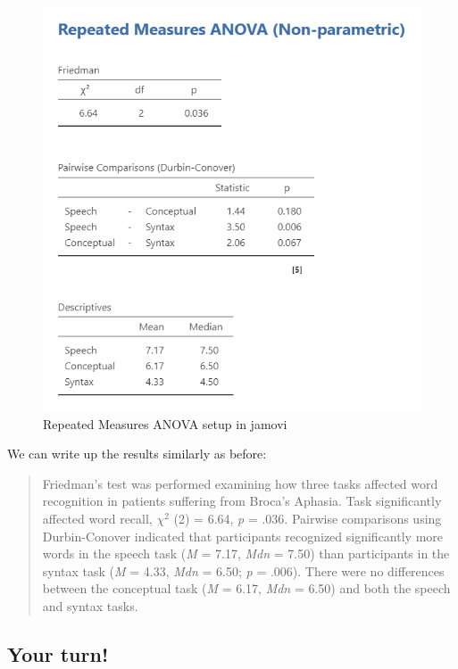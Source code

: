 \documentclass[
]{book}
\begin{document}
\begin{figure}

{\centering \includegraphics[width=1\linewidth]{images/05-repeated-measures-anova/rm-anova_friedman} 

}

\caption{Repeated Measures ANOVA setup in jamovi}\label{fig:unnamed-chunk-9}
\end{figure}

We can write up the results similarly as before:

\begin{quote}
Friedman's test was performed examining how three tasks affected word recognition in patients suffering from Broca's Aphasia. Task significantly affected word recall, \(\chi^2\) (2) = 6.64, \emph{p} = .036. Pairwise comparisons using Durbin-Conover indicated that participants recognized significantly more words in the speech task (\emph{M} = 7.17, \emph{Mdn} = 7.50) than participants in the syntax task (\emph{M} = 4.33, \emph{Mdn} = 6.50; \emph{p} = .006). There were no differences between the conceptual task (\emph{M} = 6.17, \emph{Mdn} = 6.50) and both the speech and syntax tasks.
\end{quote}

\hypertarget{your-turn-7}{%
\subsection{Your turn!}\label{your-turn-7}}
\end{document}
